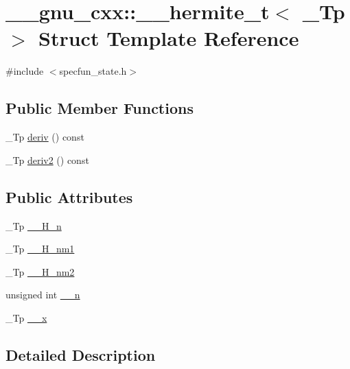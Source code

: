 \hypertarget{struct____gnu__cxx_1_1____hermite__t}{}\section{\+\_\+\+\_\+gnu\+\_\+cxx\+:\+:\+\_\+\+\_\+hermite\+\_\+t$<$ \+\_\+\+Tp $>$ Struct Template Reference}
\label{struct____gnu__cxx_1_1____hermite__t}


{\ttfamily \#include $<$specfun\+\_\+state.\+h$>$}

\subsection*{Public Member Functions}
\begin{DoxyCompactItemize}
\item 
\+\_\+\+Tp \hyperlink{struct____gnu__cxx_1_1____hermite__t_aa92fd4096ca98fedad08b95187bb7a34}{deriv} () const
\item 
\+\_\+\+Tp \hyperlink{struct____gnu__cxx_1_1____hermite__t_a2deb14d149cf302151ae1d318adec995}{deriv2} () const
\end{DoxyCompactItemize}
\subsection*{Public Attributes}
\begin{DoxyCompactItemize}
\item 
\+\_\+\+Tp \hyperlink{struct____gnu__cxx_1_1____hermite__t_a98a85357be4cb36000df3e552c197408}{\+\_\+\+\_\+\+H\+\_\+n}
\item 
\+\_\+\+Tp \hyperlink{struct____gnu__cxx_1_1____hermite__t_af2c7ee1e0f02c0debd4fbe2b5c59673e}{\+\_\+\+\_\+\+H\+\_\+nm1}
\item 
\+\_\+\+Tp \hyperlink{struct____gnu__cxx_1_1____hermite__t_a7b35cb679cb110703a0089c726b2a1ab}{\+\_\+\+\_\+\+H\+\_\+nm2}
\item 
unsigned int \hyperlink{struct____gnu__cxx_1_1____hermite__t_a33b0d9c74670451499af28732e1e54a5}{\+\_\+\+\_\+n}
\item 
\+\_\+\+Tp \hyperlink{struct____gnu__cxx_1_1____hermite__t_a0d0d266ed927f890a51f9a5ef635a5d3}{\+\_\+\+\_\+x}
\end{DoxyCompactItemize}


\subsection{Detailed Description}
